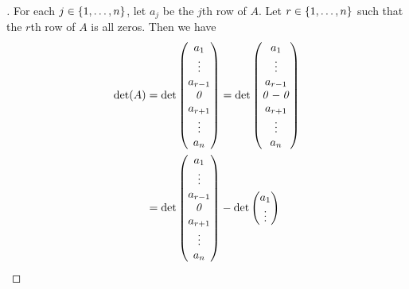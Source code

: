 \begin{proof}[]
  For each \(j \in \left\lbrace1, \dots, n\right\rbrace\), let \(a_j\) be the \(j\)th row of \(A\).
  Let \(r \in \left\lbrace1, \dots, n\right\rbrace\) such that the \(r\)th row of \(A\) is all zeros.
  Then we have
  \begin{align*}
    \det(A) & = \det\begin{pmatrix}
                      a_1       \\
                      \vdots    \\
                      a_{r - 1} \\
                      \mathit{0}       \\
                      a_{r + 1} \\
                      \vdots    \\
                      a_n
                    \end{pmatrix} = \det\begin{pmatrix}
                                          a_1       \\
                                          \vdots    \\
                                          a_{r - 1} \\
                                          \mathit{0} - \mathit{0} \\
                                          a_{r + 1} \\
                                          \vdots    \\
                                          a_n
                                        \end{pmatrix}                            \\
            & = \det\begin{pmatrix}
                      a_1       \\
                      \vdots    \\
                      a_{r - 1} \\
                      \mathit{0}       \\
                      a_{r + 1} \\
                      \vdots    \\
                      a_n
                    \end{pmatrix} - \det\begin{pmatrix}
                                          a_1       \\
                                          \vdots    \\

\end{pmatrix}
\end{align*}
\end{proof}
